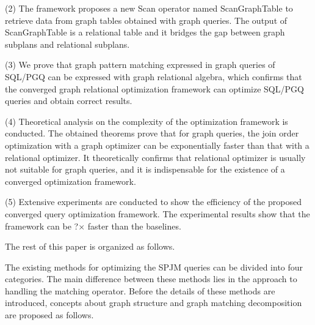 {(2) The framework proposes a new Scan operator named ScanGraphTable to retrieve data from graph tables obtained with graph queries.
The output of ScanGraphTable is a relational table and it bridges the gap between graph subplans and relational subplans.

(3) We prove that graph pattern matching expressed in graph queries of SQL/PGQ can be expressed with graph relational algebra, which confirms that the converged graph relational optimization framework can optimize SQL/PGQ queries and obtain correct results.



(4) Theoretical analysis on the complexity of the optimization framework is conducted.
The obtained theorems prove that for graph queries, the join order optimization with a graph optimizer can be exponentially faster than that with a relational optimizer.
It theoretically confirms that relational optimizer is usually not suitable for graph queries, and it is indispensable for the existence of a converged optimization framework.

(5) Extensive experiments are conducted to show the efficiency of the proposed converged query optimization framework.
The experimental results show that the framework can be ?$\times$ faster than the baselines.

The rest of this paper is organized as follows.


The existing methods for optimizing the SPJM queries can be divided into four categories.
The main difference between these methods lies in the approach to handling the matching operator.
Before the details of these methods are introduced, concepts about graph structure and graph matching decomposition are proposed as follows.
}
